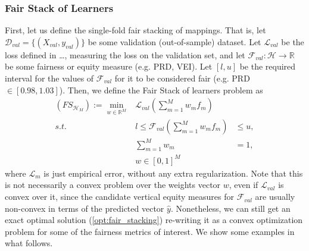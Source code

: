 \documentclass[11pt]{article}
\theoremstyle{plain}
\theoremstyle{definition}
\newcommand{\R}{\mathbb{R}}
\newcommand{\1}{\mathbf{1}}
\newcommand{\D}{\mathcal{D}}
\newcommand{\F}{\mathcal{F}}
\renewcommand{\L}{\mathcal{L}}
\renewcommand{\H}{\mathcal{H}}
\renewcommand{\R}{\mathbb{R}}
\begin{document}
{\subsubsection{Fair Stack of Learners}

First, let us define the single-fold fair stacking of mappings. That is, let $\D_{val}= \{(X_{val}, y_{val})\}$ be some validation (out-of-sample) dataset. Let $\L_{val}$ be the loss defined in  \ldots , measuring the loss on the validation set, and let $\F_{val}:\H \rightarrow \R$ be some fairness or equity measure (e.g. PRD, VEI). Let $[l,u]$ be the required interval for the values of $\F_{val}$ for it to be considered fair (e.g. PRD $\in [0.98, 1.03]$). Then, we define the  Fair Stack of learners problem as
{\everymath{\displaystyle}
\begin{equation}
\label{opt:fair_stacking}
    \begin{array}{rrl}
    (FS_{\H_M}):=   \min_{w \in \R^M}  & \L_{val}\left(\sum_{m=1}^M w_m f_m \right)\\
        s.t. &  l \leq \F_{val}\left(\sum_{m=1}^M w_mf_m\right)& \leq  u,\\
        & \sum_{m=1}^M w_m& =1, \\
       &  w \in [0,1]^M
    \end{array}
\end{equation}
}
\hspace{-3.3mm} where $\L_m$ is just empirical error, without any extra regularization. Note that this is not necessarily a convex problem over the weights vector $w$, even if $\L_{val}$ is convex over it, since the candidate vertical equity measures for $\F_{val}$ are usually non-convex in terms of the predicted vector $\hat{y}$. Nonetheless, we can still get an exact optimal solution (\ref{opt:fair_stacking}) re-writing it as a convex optimization problem for some of the fairness metrics of interest. We show some examples in what follows.

\medskip

}
\end{document}

